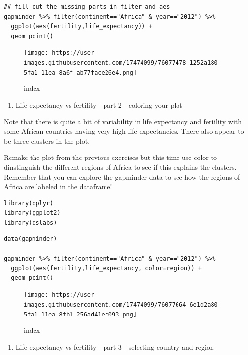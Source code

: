 \documentclass[
]{article}
\providecommand{\tightlist}{%
  \setlength{\itemsep}{0pt}\setlength{\parskip}{0pt}}
\begin{document}
\begin{verbatim}
## fill out the missing parts in filter and aes
gapminder %>% filter(continent=="Africa" & year=="2012") %>%
  ggplot(aes(fertility,life_expectancy)) +
  geom_point()
\end{verbatim}

\begin{figure}
\centering
\texttt{[image: https://user-images.githubusercontent.com/17474099/76077478-1252a180-5fa1-11ea-8a6f-ab77face26e4.png]}
\caption{index}
\end{figure}

\begin{enumerate}
\def\labelenumi{\arabic{enumi}.}
\setcounter{enumi}{1}
\tightlist
\item
  Life expectancy vs fertility - part 2 - coloring your plot
\end{enumerate}

Note that there is quite a bit of variability in life expectancy and
fertility with some African countries having very high life
expectancies. There also appear to be three clusters in the plot.

Remake the plot from the previous exercises but this time use color to
dinstinguish the different regions of Africa to see if this explains the
clusters. Remember that you can explore the gapminder data to see how
the regions of Africa are labeled in the dataframe!

\begin{verbatim}
library(dplyr)
library(ggplot2)
library(dslabs)
\end{verbatim}

\begin{verbatim}
data(gapminder)

gapminder %>% filter(continent=="Africa" & year=="2012") %>%
  ggplot(aes(fertility,life_expectancy, color=region)) +
  geom_point()
\end{verbatim}

\begin{figure}
\centering
\texttt{[image: https://user-images.githubusercontent.com/17474099/76077664-6e1d2a80-5fa1-11ea-8fb1-256ad41ec093.png]}
\caption{index}
\end{figure}

\begin{enumerate}
\def\labelenumi{\arabic{enumi}.}
\setcounter{enumi}{2}
\tightlist
\item
  Life expectancy vs fertility - part 3 - selecting country and region
\end{enumerate}
\end{document}
